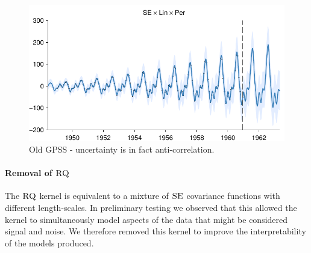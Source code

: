 \documentclass{article}
\begin{document}
\begin{figure}[h]
\centering
\includegraphics[width=0.98\columnwidth]{figures/old-gpss/01-airline-months_2}
\caption{Old GPSS - uncertainty is in fact anti-correlation.}
\label{fig:anti_corr_2}
\end{figure}

\paragraph{Removal of ${\textsc{RQ}}$}
The ${\textsc{RQ}}$ kernel is equivalent to a mixture of ${\textsc{SE}}$ covariance functions with different length-scales.
In preliminary testing we observed that this allowed the kernel to simultaneously model aspects of the data that might be considered signal and noise.
We therefore removed this kernel to improve the interpretability of the models produced.
\end{document}

